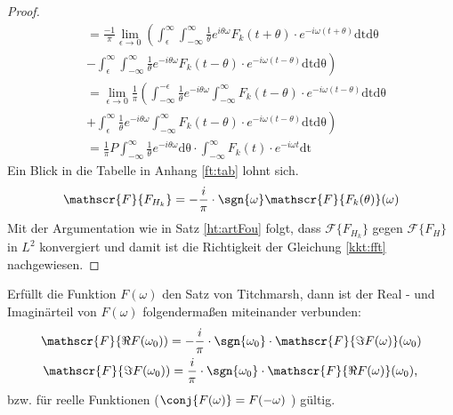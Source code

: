 \begin{satz}
\begin{proof}
\begin{align}
&=\frac{-1}{\pi}\lim_{\epsilon \rightarrow 0} \left(\int_{\epsilon}^{\infty} \int_{-\infty}^{\infty} \frac{1}{\theta} e^{i \theta \omega} F_k(t + \theta) \cdot e^{-i \omega (t  + \theta)} \mathrm{dt} \mathrm{d\theta} \right. \\
&\left. - \int_{\epsilon}^{\infty} \int_{-\infty}^{\infty} \frac{1}{\theta} e^{-i \theta \omega} F_k(t - \theta) \cdot e^{-i \omega (t  - \theta)} \mathrm{dt} \mathrm{d\theta}\right)\\
&=  \lim_{\epsilon \rightarrow 0}\frac{1}{\pi}\left( \int_{-\infty}^{-\epsilon} \frac{1}{\theta} e^{-i \theta \omega} \int_{-\infty}^{\infty}  F_k(t - \theta) \cdot e^{-i \omega (t  - \theta)} \mathrm{dt} \mathrm{d\theta} \right.\\
&\left.+ \int_{\epsilon}^{\infty} \frac{1}{\theta} e^{-i \theta \omega} \int_{-\infty}^{\infty} F_k(t - \theta) \cdot e^{-i \omega (t  - \theta)} \mathrm{dt} \mathrm{d\theta} \right)\\
&= \frac{1}{\pi} P \int_{-\infty}^{\infty} \frac{1}{\theta} e^{-i \theta \omega} \mathrm{d\theta} \cdot  \int_{-\infty}^{\infty} F_k(t) \cdot e^{-i \omega t} \mathrm{dt} 
\end{align}
Ein Blick in die Tabelle in Anhang \ref{ft:tab} lohnt sich.
\begin{align}
\mathscr{F}\{F_{H_k}\} =  -\frac{i}{\pi} \cdot \sgn{\omega} \mathscr{F}\{F_k(\theta)\}(\omega)
\end{align}
Mit der Argumentation wie in Satz \ref{ht:artFou} folgt, dass $\mathscr{F}\{F_{H_k}\}$ gegen $\mathscr{F}\{F_{H}\}$ in $L^2$ konvergiert und damit ist die Richtigkeit der Gleichung \ref{kkt:fft} nachgewiesen.
\end{proof}
\end{satz}
\label{kkt:Bemerkung}Erfüllt die Funktion $F(\omega)$ den Satz von Titchmarsh, dann ist der Real - und Imaginärteil von $F(\omega)$ folgendermaßen miteinander verbunden:
\begin{align}
	\mathscr{F}\{\Re{F(\omega_0)}) = -\frac{i}{\pi} \cdot \sgn{\omega_0} \cdot \mathscr{F}\{\Im{F(\omega)}\}(\omega_0)\\
	\mathscr{F}\{\Im{F(\omega_0)}) = \frac{i}{\pi} \cdot \sgn{\omega_0} \cdot \mathscr{F}\{\Re{F(\omega)}\}(\omega_0)\text{, }
\end{align}
bzw. für reelle Funktionen ($\conj{F(\omega)} = F(-\omega)$ ) gültig.
